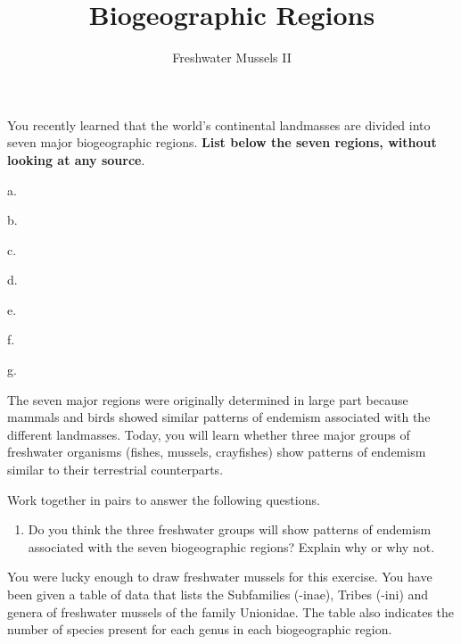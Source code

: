 \documentclass[11pt]{article}
\title{Biogeographic Regions}
\author{Freshwater Mussels II}
\date{}                                           %
\begin{document}
\maketitle
\thispagestyle{empty}


You recently learned that the world's continental landmasses are divided
into seven major biogeographic regions. \textbf{List below the seven
regions, without looking at any source}.

\begin{multicols}{2}
a.\vspace{0.5\baselineskip}

b.\vspace{0.5\baselineskip}

c.\vspace{0.5\baselineskip}

d.\vspace{0.5\baselineskip}

\columnbreak

e.\vspace{0.5\baselineskip}

f.\vspace{0.5\baselineskip}

g.\vspace{0.5\baselineskip}

\end{multicols}

The seven major regions were originally determined in large part because
mammals and birds showed similar patterns of endemism associated with
the different landmasses. Today, you will learn whether three major
groups of freshwater organisms (fishes, mussels, crayfishes) show
patterns of endemism similar to their terrestrial counterparts.

Work together in pairs to answer the following questions.

\begin{enumerate}[leftmargin=*]
\item Do you think the three freshwater groups will show patterns of
endemism associated with the seven biogeographic regions? Explain why or
why not.\vspace{10\baselineskip}

\end{enumerate}

You were lucky enough to draw freshwater mussels for this exercise. You
have been given a table of data that lists the Subfamilies (-inae),
Tribes (-ini) and genera of freshwater mussels of the family Unionidae.
The table also indicates the number of species present for each genus in
each biogeographic region.
\end{document}
